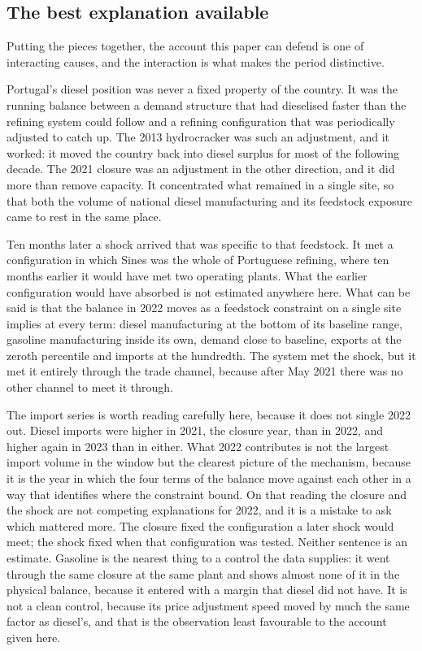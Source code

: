 \documentclass[11pt,a4paper]{article}
\begin{document}
\subsection{The best explanation available}

Putting the pieces together, the account this paper can defend is one of interacting causes, and
the interaction is what makes the period distinctive.

Portugal's diesel position was never a fixed property of the country. It was the running
balance between a demand structure that had dieselised faster than the refining system could
follow and a refining configuration that was periodically adjusted to catch up. The 2013
hydrocracker was such an adjustment, and it worked: it moved the country back into diesel
surplus for most of the following decade. The 2021 closure was an adjustment in the other
direction, and it did more than remove capacity. It concentrated what remained in a single
site, so that both the volume of national diesel manufacturing and its feedstock exposure
came to rest in the same place.

Ten months later a shock arrived that was specific to that feedstock. It met a
configuration in which Sines was the whole of Portuguese refining, where ten months earlier it
would have met two operating plants. What the earlier configuration would have absorbed is not
estimated anywhere here. What can be said is that the balance in 2022 moves as a feedstock
constraint on a single site implies at every term: diesel manufacturing at the bottom of its
baseline range, gasoline manufacturing inside its own, demand close to baseline, exports at
the zeroth percentile and imports at the hundredth. The system met the shock, but it met it
entirely through the trade channel, because after May 2021 there was no other channel to meet it
through.

The import series is worth reading carefully here, because it does not single 2022 out. Diesel
imports were higher in 2021, the closure year, than in 2022, and higher again in 2023 than in
either. What 2022 contributes is not the largest import volume in the window but the clearest
picture of the mechanism, because it is the year in which the four terms of the balance move
against each other in a way that identifies where the constraint bound. On that reading the
closure and the shock are not competing explanations for 2022, and it is a mistake to ask which
mattered more. The closure fixed the configuration a later shock would meet; the shock
fixed when that configuration was tested. Neither sentence is an estimate. Gasoline is the nearest thing to a control the data
supplies: it went through the same closure at the same plant and shows almost none of it in the
physical balance, because it entered with a margin that diesel did not have. It is not a clean
control, because its price adjustment speed moved by much the same factor as diesel's, and that
is the observation least favourable to the account given here.
\end{document}
